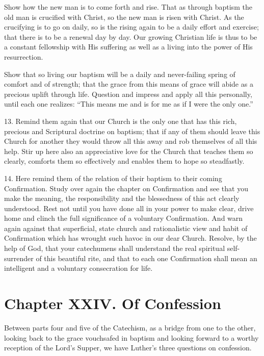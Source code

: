 Show how the new man is to come forth and rise. That as through baptism the old man is crucified with Christ, so the new man is risen with Christ. As the crucifying is to go on daily, so is the rising again to be a daily effort and exercise; that there is to be a renewal day by day. Our growing Christian life is thus to be a constant fellowship with His suffering as well as a living into the power of His resurrection. 

Show that so living our baptism will be a daily and never-failing spring of comfort and of strength; that the grace from this means of grace will abide as a precious uplift through life. Question and impress and apply all this personally, until each one realizes: “This means me and is for me as if I were the only one.”

13. Remind them again that our Church is the only one that has this rich, precious and Scriptural doctrine on baptism; that if any of them should leave this Church for another they would throw all this away and rob themselves of all this help. Stir up here also an appreciative love for the Church that teaches them so clearly, comforts them so effectively and enables them to hope so steadfastly. 

14. Here remind them of the relation of their baptism to their coming Confirmation. Study over again the chapter on Confirmation and see that you make the meaning, the responsibility and the blessedness of this act clearly understood. Rest not until you have done all in your power to make clear, drive home and clinch the full significance of a voluntary Confirmation. And warn again against that superficial, state church and rationalistic view and habit of Confirmation which has wrought such havoc in our dear Church. Resolve, by the help of God, that your catechumens shall understand the real spiritual self-surrender of this beautiful rite, and that to each one Confirmation shall mean an intelligent and a voluntary consecration for life. 

\chapter{Chapter XXIV. Of Confession}

Between parts four and five of the Catechism, as a bridge from one to the other, looking back to the grace vouchsafed in baptism and looking forward to a worthy reception of the Lord’s Supper, we have Luther’s three questions on confession.

